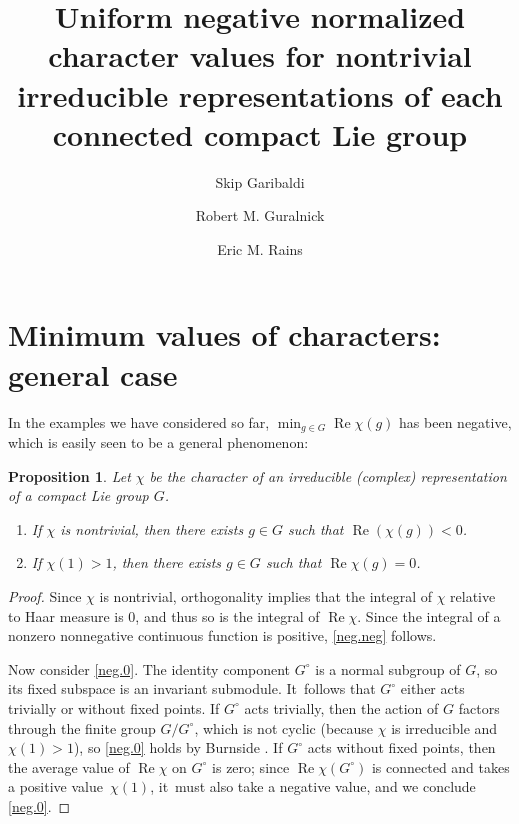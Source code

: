 \documentclass[10pt]{amsart}
\newenvironment{enumeratea}
{\bgroup\def\theenumi{\alph{enumi}}\def\theenumii{\roman{enumii}}\begin{enumerate}}
{\end{enumerate}\egroup}
\newtheorem{prop}[equation]{Proposition}
\theoremstyle{definition}
\let\ic\circ
\DeclareMathOperator{\RE}{Re}
\numberwithin{equation}{section}
\begin{document}
\title{Uniform negative normalized character values for nontrivial irreducible representations of each connected compact Lie group}
\author{Skip Garibaldi \and Robert M. Guralnick \and Eric M. Rains}
\maketitle
\setcounter{section}{17}
\section{Minimum values of characters: general case} \label{general.sec}

In the examples we have considered so far, $\min_{g \in G} \RE \chi(g)$ has been negative, which is easily seen to be a general phenomenon:

\begin{prop} \label{neg.val}
Let $\chi$ be the character of an irreducible (complex) representation of a
compact Lie group $G$.
\begin{enumeratea}
\item \label{neg.neg} If $\chi$ is nontrivial, then there exists $g\in G$ such that $\RE(\chi(g))<0$.
\item \label{neg.0} If $\chi(1) > 1$, then there exists $g \in G$ such that $\RE \chi(g) = 0$.
\end{enumeratea}
\end{prop}

\begin{proof}
Since $\chi$ is nontrivial, orthogonality implies that the
integral of $\chi$ relative to Haar measure is 0, and thus so is the
integral of $\RE\chi$. Since the integral of a nonzero nonnegative
continuous function is positive, \eqref{neg.neg} follows.

Now consider \eqref{neg.0}. The identity component $G^\ic$ is a normal subgroup of $G$, so its fixed subspace is an invariant submodule. It~follows that $G^\ic$ either acts trivially or without fixed points.
If $G^\ic$ acts trivially, then the action of $G$ factors through the finite group $G/G^\ic$, which is not cyclic (because $\chi$ is irreducible and $\chi(1) > 1$), so \eqref{neg.0} holds by Burnside \cite[p.\,115]{Burnside:tr}. If $G^\ic$ acts without fixed points, then the average value of $\RE \chi$ on $G^\ic$ is zero; since $\RE \chi(G^\ic)$ is connected and takes a positive value~$\chi(1)$, it~must also take a negative value, and we conclude \eqref{neg.0}.
\end{proof}
\end{document}

